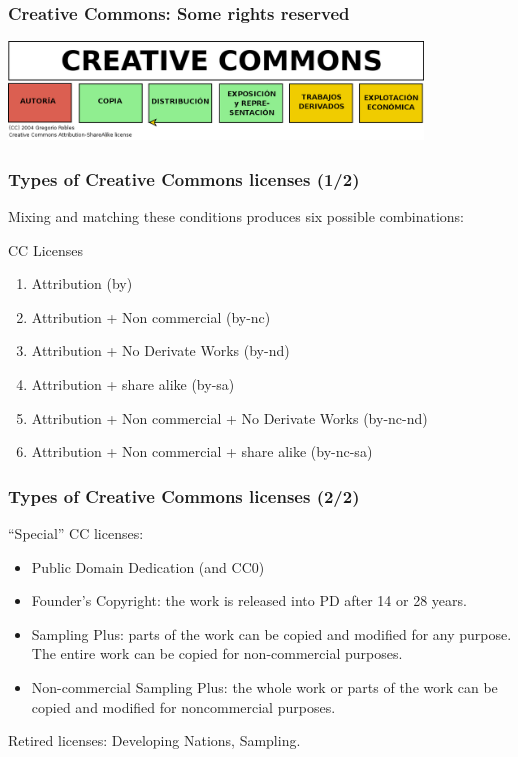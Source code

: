 \documentclass{beamer}
\begin{document}

\begin{frame}
\frametitle{Creative Commons: Some rights reserved}

\includegraphics[width=11cm]{figs/CreativeCommons.png}

\end{frame}


\begin{frame}
\frametitle{Types of Creative Commons licenses (1/2)}

Mixing and matching these conditions produces six possible combinations:

\begin{block}{CC Licenses}
\begin{enumerate}
\item Attribution (by)
\item Attribution + Non commercial (by-nc)
\item Attribution + No Derivate Works (by-nd)
\item Attribution + share alike (by-sa)
\item Attribution + Non commercial + No Derivate Works (by-nc-nd)
\item Attribution + Non commercial + share alike (by-nc-sa)
\end{enumerate}                                                 
\end{block}
\end{frame}


\begin{frame}
\frametitle{Types of Creative Commons licenses (2/2)}

``Special'' CC licenses:
\begin{itemize}
\item Public Domain Dedication (and CC0)
\item \alert{Founder's Copyright:} the work is released into PD after 14 or 28 years.
\item \alert{Sampling Plus:} parts of the work can be copied and modified for any purpose. The entire work can be copied for non-commercial purposes.
\item \alert{Non-commercial Sampling Plus:} the whole work or parts of the work can be copied and modified for noncommercial purposes. 
\end{itemize}                                                 

Retired licenses: Developing Nations, Sampling.

\end{frame}
\end{document}
